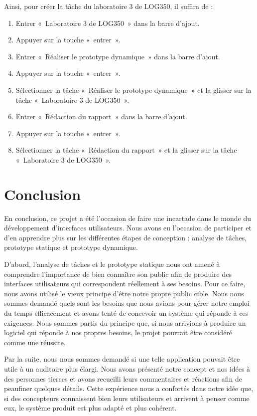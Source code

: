 \documentclass[letterpaper, oneside, 12pt, these, creativecommons]{thETS}
\begin{document}
Ainsi, pour créer la tâche du laboratoire 3 de LOG350, il suffira de :

\begin{enumerate}
    \item Entrer « Laboratoire 3 de LOG350 » dans la barre d'ajout.
    \item Appuyer sur la touche « entrer ».
    \item Entrer « Réaliser le prototype dynamique » dans la barre d'ajout.
    \item Appuyer sur la touche « entrer ».
    \item Sélectionner la tâche « Réaliser le prototype dynamique » et la glisser sur la tâche « Laboratoire 3 de LOG350 ».
    \item Entrer « Rédaction du rapport » dans la barre d'ajout.
    \item Appuyer sur la touche « entrer ».
    \item Sélectionner la tâche « Rédaction du rapport » et la glisser sur la tâche « Laboratoire 3 de LOG350 ».
\end{enumerate}

\chapter{Conclusion}

En conclusion, ce projet a été l'occasion de faire une incartade dans le monde du développement d'interfaces utilisateurs. Nous avons eu l'occasion de participer et d'en apprendre plus sur les différentes étapes de conception : analyse de tâches, prototype statique et prototype dynamique.

D'abord, l'analyse de tâches et le prototype statique nous ont amené à comprendre l'importance de bien connaître son public afin de produire des interfaces utilisateurs qui correspondent réellement à ses besoins. Pour ce faire, nous avons utilisé le vieux principe d'être notre propre public cible. Nous nous sommes demandé quels sont les besoins que nous avions pour gérer notre emploi du temps efficacement et avons tenté de concevoir un système qui réponde à ces exigences. Nous sommes partis du principe que, si nous arrivions à produire un logiciel qui réponde à nos propres besoins, le projet pourrait être considéré comme une réussite.

Par la suite, nous nous sommes demandé si une telle application pouvait être utile à un auditoire plus élargi. Nous avons présenté notre concept et nos idées à des personnes tierces et avons recueilli leurs commentaires et réactions afin de peaufiner quelques détails. Cette expérience nous a confortés dans notre idée que, si des concepteurs connaissent bien leurs utilisateurs et arrivent à penser comme eux, le système produit est plus adapté et plus cohérent.
\end{document}

